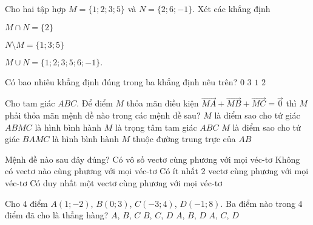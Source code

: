 \begin{ex}%
Cho hai tập hợp $M=\{1;2;3;5\}$ và $N=\{2;6;-1\}$. Xét các khẳng định
\begin{enumEX}[(I)]{3}
\item $M\cap N=\{2\}$
\item $N\setminus M=\{1;3;5\}$ 
\item $M\cup N=\{1;2;3;5;6;-1\}.$ 
\end{enumEX}
Có bao nhiêu khẳng định đúng trong ba khẳng định nêu trên?
	\choice
	{$0$}
	{$3$}
	{$1$}
	{\True $2$}
\end{ex}

\begin{ex}%
Cho tam giác $ABC$. Để điểm $M$ thỏa mãn điều kiện $\overrightarrow{MA}+\overrightarrow{MB}+\overrightarrow{MC}=\overrightarrow{0}$ thì $M$ phải thỏa mãn mệnh đề nào trong các mệnh đề sau?
	\choice
	{$M$ là điểm sao cho tứ giác $ABMC$ là hình bình hành}
	{\True $M$ là trọng tâm tam giác $ABC$}
	{$M$ là điểm sao cho tứ giác $BAMC$ là hình bình hành}
	{$M$ thuộc đường trung trực của $AB$}
\end{ex}

\begin{ex}%
Mệnh đề nào sau đây đúng?
	\choice
	{Có vô số vectơ cùng phương với mọi véc-tơ}
	{Không có vectơ nào cùng phương với mọi véc-tơ}
	{Có ít nhất 2 vectơ cùng phương với mọi véc-tơ}
	{\True Có duy nhất một vectơ cùng phương với mọi véc-tơ}
\end{ex}

\begin{ex}%
Cho $4$ điểm $A(1;-2)$, $B(0;3)$, $C(-3;4)$, $D(-1;8)$. Ba điểm nào trong $4$ điểm đã cho là thẳng
hàng?
	\choice
	{$A$, $B$, $C$}
	{$B$, $C$, $D$}
	{\True $A$, $B$, $D$}
	{$A$, $C$, $D$}
\end{ex}

